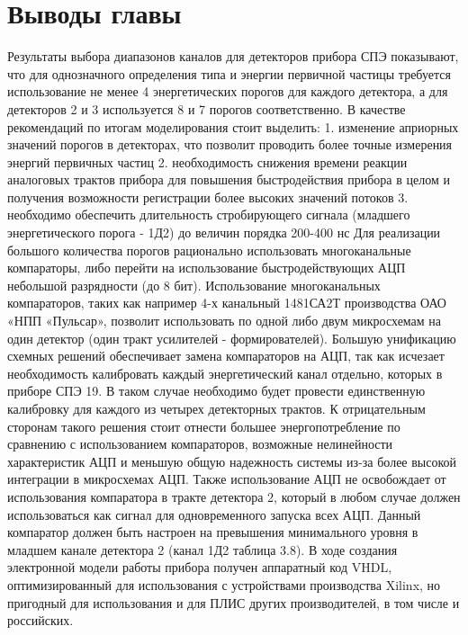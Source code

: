 \section{Выводы главы}
Результаты выбора диапазонов каналов для детекторов прибора СПЭ показывают, что для однозначного определения типа и энергии первичной частицы требуется использование не менее 4 энергетических порогов для каждого детектора, а для детекторов 2 и 3 используется 8 и 7 порогов соответственно. 
В качестве рекомендаций по итогам моделирования стоит выделить:
1.	изменение априорных значений порогов в детекторах, что позволит проводить более точные измерения энергий первичных частиц 
2.	необходимость снижения времени реакции аналоговых трактов прибора для повышения быстродействия прибора в целом и получения возможности регистрации более высоких значений потоков
3.	необходимо обеспечить длительность стробирующего сигнала (младшего энергетического порога - 1Д2) до величин порядка 200-400 нс
Для реализации большого количества порогов рационально использовать многоканальные компараторы, либо перейти на использование быстродействующих АЦП небольшой разрядности (до 8 бит). Использование многоканальных компараторов, таких как например 4-х канальный 1481СА2Т производства ОАО «НПП «Пульсар», позволит использовать по одной либо двум микросхемам на один детектор (один тракт усилителей - формирователей). Большую унификацию схемных решений обеспечивает замена компараторов на АЦП, так как исчезает необходимость калибровать каждый энергетический канал отдельно, которых в приборе СПЭ 19. В таком случае необходимо будет провести единственную калибровку для каждого из четырех детекторных трактов. К отрицательным сторонам такого решения стоит отнести большее энергопотребление по сравнению с использованием компараторов, возможные нелинейности характеристик АЦП и меньшую общую надежность системы из-за более высокой интеграции в микросхемах АЦП. Также использование АЦП не освобождает от использования компаратора в тракте детектора 2, который в любом случае должен использоваться как сигнал для одновременного запуска всех АЦП. Данный компаратор должен быть настроен на превышения минимального уровня в младшем канале детектора 2 (канал 1Д2 таблица 3.8).
В ходе создания электронной модели работы прибора получен аппаратный код VHDL, оптимизированный для использования с устройствами производства Xilinx, но пригодный для использования и для ПЛИС других производителей, в том числе и российских.

